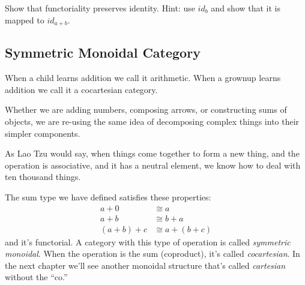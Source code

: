 \documentclass[DaoFP]{subfiles}
\begin{document}
\begin{exercise}
Show that functoriality preserves identity. Hint: use $id_b$ and show that it is mapped to $id_{a+b}$.
\end{exercise}

\subsection{Symmetric Monoidal Category}
When a child learns addition we call it arithmetic. When a grownup learns addition we call it a cocartesian category.

Whether we are adding numbers, composing arrows, or constructing sums of objects, we are re-using the same idea of decomposing complex things into their simpler components.  

As Lao Tzu would say, when things come together to form a new thing, and the operation is associative, and it has a neutral element, we know how to deal with ten thousand things.

The sum type we have defined satisfies these properties:
\begin{align*}
a + 0 &\cong a \\
a + b &\cong b + a \\
(a + b) + c &\cong a + (b + c)
\end{align*}
and it's functorial. A category with this type of operation is called \emph{symmetric monoidal}. When the operation is the sum (coproduct), it's called \emph{cocartesian}. In the next chapter we'll see another monoidal structure that's called \emph{cartesian} without the ``co.''
\end{document}
